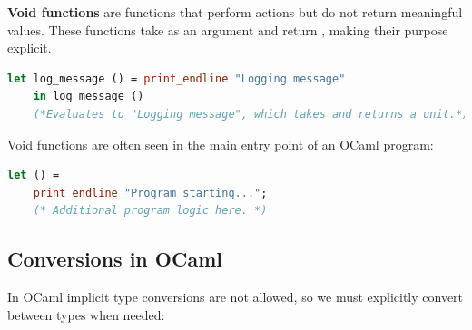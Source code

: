 \begin{Def}

\label{def:void}
\textbf{Void functions} are functions that perform actions but do not return meaningful values. 
These functions take  as an argument and return , making their purpose explicit.

\begin{lstlisting}[language=OCaml, caption={Void Function Example}, numbers=none]
    let log_message () = print_endline "Logging message" 
    in log_message ()
    (*Evaluates to "Logging message", which takes and returns a unit.*)
\end{lstlisting}

\noindent
Void functions are often seen in the main entry point of an OCaml program:
\begin{lstlisting}[language=OCaml, caption={Using \snippet{let ()} in the Main Function}, numbers=none]
    let () =
    print_endline "Program starting...";
    (* Additional program logic here. *)
\end{lstlisting}
\end{Def}



\newpage 

\subsection{Conversions in OCaml}

In OCaml implicit type conversions are not allowed, so we must explicitly convert between types when needed:

